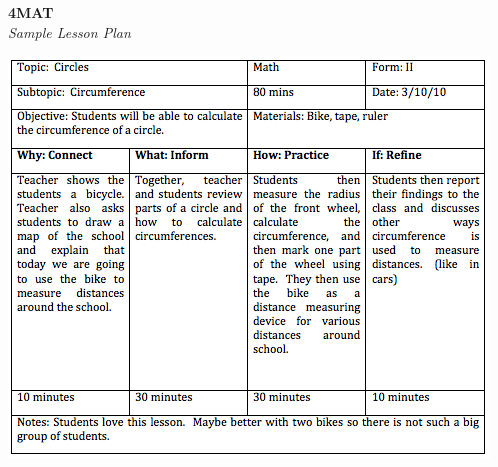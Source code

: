 \newpage
\begin{center}
\textbf{4MAT }\\
\textit{Sample Lesson Plan}
\end{center}

\begin{center}
\includegraphics[scale=1]{./img/picture-7.png} 
\end{center}